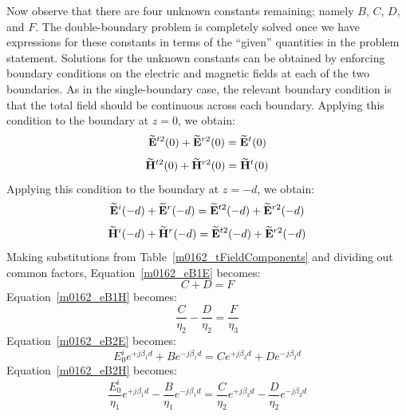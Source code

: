 Now observe that there are four unknown constants remaining; namely $B$, $C$, $D$, and $F$.  
The double-boundary problem is completely solved once we have expressions for these constants in terms of the ``given'' quantities in the problem statement.
Solutions for the unknown constants can be obtained by enforcing boundary conditions on the electric and magnetic fields at each of the two boundaries.
As in the single-boundary case, the relevant boundary condition is that the total field should be continuous across each boundary.
Applying this condition to the boundary at $z=0$, we obtain:
%
\begin{equation}
\widetilde{\bf E}^{t2}(0) + \widetilde{\bf E}^{r2}(0) = \widetilde{\bf E}^{t}(0) 
\label{m0162_eB1E}
\end{equation}
%
\begin{equation}
\widetilde{\bf H}^{t2}(0) + \widetilde{\bf H}^{r2}(0) = \widetilde{\bf H}^{t}(0)
\label{m0162_eB1H}
\end{equation}
%
Applying this condition to the boundary at $z=-d$, we obtain:
%
\begin{equation}
\widetilde{\bf E}^i(-d) + \widetilde{\bf E}^r(-d)  = \widetilde{\bf E}^{t2}(-d) + \widetilde{\bf E}^{r2}(-d)
\label{m0162_eB2E}
\end{equation}
%
\begin{equation}
\widetilde{\bf H}^i(-d) + \widetilde{\bf H}^r(-d)  = \widetilde{\bf E}^{t2}(-d) + \widetilde{\bf E}^{r2}(-d)
\label{m0162_eB2H}
\end{equation}
%
Making substitutions from Table~\ref{m0162_tFieldComponents} and dividing out common factors, Equation~\ref{m0162_eB1E} becomes:
%
\begin{equation}
C + D =F
\label{m0162_eB1Es}
\end{equation}
%
Equation~\ref{m0162_eB1H} becomes:
%
\begin{equation}
\frac{C}{\eta_2} - \frac{D}{\eta_2}  = \frac{F}{\eta_3} 
\label{m0162_eB1Hs}
\end{equation}
%
Equation~\ref{m0162_eB2E} becomes:
%
\begin{equation}
E_0^i e^{+j\beta_1 d} + B e^{-j\beta_1 d}  = C e^{+j\beta_2 d} + D e^{-j\beta_2 d}
\label{m0162_eB2Es}
\end{equation}
Equation~\ref{m0162_eB2H} becomes:
%
\begin{equation}
\frac{E_0^i}{\eta_1} e^{+j\beta_1 d} - \frac{B}{\eta_1} e^{-j\beta_1 d} = \frac{C}{\eta_2} e^{+j\beta_2 d} - \frac{D}{\eta_2} e^{-j\beta_2 d}
\label{m0162_eB2Hs}
\end{equation}

